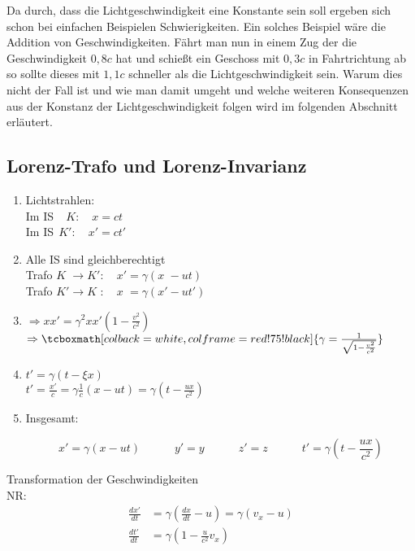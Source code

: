 \documentclass[titlepage,11pt,a4paper,ngerman]{report}
\newcommand{\frbox}[2]{\begin{tcolorbox}[colback=white,colframe=red!75!black,fonttitle=\bfseries,title=#1]#2\end{tcolorbox}}
\newcommand{\rmbox}[1]{\tcboxmath[colback=white,colframe=red!75!black]{#1}}
\begin{document}
Da durch, dass die Lichtgeschwindigkeit eine Konstante sein soll ergeben sich schon bei einfachen Beispielen Schwierigkeiten. Ein solches Beispiel wäre die Addition von Geschwindigkeiten. Fährt man nun in einem Zug der die Geschwindigkeit $ 0{,}8 c $ hat und schießt ein Geschoss mit $ 0{,}3 c $ in Fahrtrichtung ab so sollte dieses mit $ 1{,}1 c $ schneller als die Lichtgeschwindigkeit sein. Warum dies nicht der Fall ist und wie man damit umgeht und welche weiteren Konsequenzen aus der Konstanz der Lichtgeschwindigkeit folgen wird im folgenden Abschnitt erläutert.

\subsection{Lorenz-Trafo und Lorenz-Invarianz}

\begin{enumerate}[1)]
	\item Lichtstrahlen:\\
	Im IS$ \phantom' $ $ \ \ K: \quad x = ct $\\
	Im IS$ \ \ K': \quad x' = ct' $
	\item Alle IS sind gleichberechtigt\\
	Trafo $ K\phantom' \rightarrow K': \quad x' = \gamma (x\phantom' - ut) $\\
	Trafo $ K' \rightarrow K\phantom': \quad x\phantom' = \gamma (x' - ut') $
	\item $ \Rightarrow xx' = \gamma^2 xx' \left(1 - \frac{v^2}{c^2}\right) $\\
	$ \Rightarrow \rmbox{\gamma = \frac{1}{\sqrt{1 - \frac{v^2}{c^2}}}} $
	
	
	\item
	$t' = \gamma (t - \xi x)$\\
	$t' = \frac{x'}{c} = \gamma \frac{1}{c} (x - ut) = \gamma (t - \frac{ux}{c^2})$
	\item Insgesamt:
	\frbox{Lorenz-Trafo}{\begin{equation*}
	x' = \gamma (x - ut) \qquad \quad y' = y \qquad \quad z' = z \qquad \quad t' = \gamma \left(t - \frac{ux}{c^2}\right)
	\end{equation*}}
\end{enumerate}
Transformation der Geschwindigkeiten\\
NR:
\begin{align*}
\frac{dx'}{dt} &= \gamma \left(\frac{dx}{dt} - u\right) = \gamma (v_x - u)\\
\frac{dt'}{dt} &= \gamma \left(1 - \frac{u}{c^2} v_x\right)
\end{align*}
\end{document}
